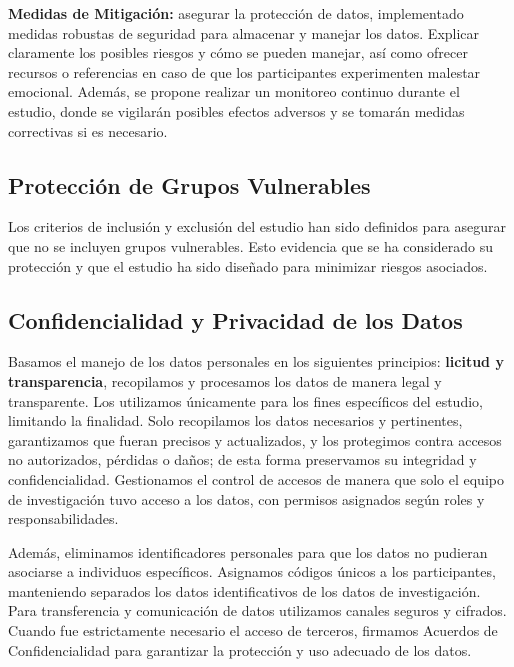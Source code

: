 \textbf{Medidas de Mitigación:} asegurar la protección de datos, implementado medidas robustas de seguridad para almacenar y manejar los datos. Explicar claramente los posibles riesgos y cómo se pueden manejar, así como ofrecer recursos o referencias en caso de que los participantes experimenten malestar emocional. Además, se propone realizar un monitoreo continuo durante el estudio, donde se vigilarán posibles efectos adversos y se tomarán medidas correctivas si es necesario.

\subsection{Protección de Grupos Vulnerables}
\label{subsec:proteccion_grupos_vulnerables}

Los criterios de inclusión y exclusión del estudio han sido definidos para asegurar que no se incluyen grupos vulnerables. Esto evidencia que se ha considerado su protección y que el estudio ha sido diseñado para minimizar riesgos asociados.

\subsection{Confidencialidad y Privacidad de los Datos}
\label{subsec:confidencialidad_privacidad}

Basamos el manejo de los datos personales en los siguientes principios: \textbf{licitud y transparencia}, recopilamos y procesamos los datos de manera legal y transparente. Los utilizamos únicamente para los fines específicos del estudio, limitando la finalidad. Solo recopilamos los datos necesarios y pertinentes, garantizamos que fueran precisos y actualizados, y los protegimos contra accesos no autorizados, pérdidas o daños; de esta forma preservamos su integridad y confidencialidad. Gestionamos el control de accesos de manera que solo el equipo de investigación tuvo acceso a los datos, con permisos asignados según roles y responsabilidades.

Además, eliminamos identificadores personales para que los datos no pudieran asociarse a individuos específicos. Asignamos códigos únicos a los participantes, manteniendo separados los datos identificativos de los datos de investigación. Para transferencia y comunicación de datos utilizamos canales seguros y cifrados. Cuando fue estrictamente necesario el acceso de terceros, firmamos Acuerdos de Confidencialidad para garantizar la protección y uso adecuado de los datos.


